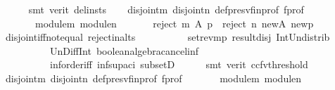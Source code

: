 \begin{isabellebody}
\ \ \ \ \isamarkupfalse%
\ {\isacharparenleft}{\kern0pt}smt\ {\isacharparenleft}{\kern0pt}verit{\isacharcomma}{\kern0pt}\ del{\isacharunderscore}{\kern0pt}insts{\isacharparenright}{\kern0pt}{\isacharparenright}{\kern0pt}\isanewline
\ \ \isamarkupfalse%
\ disjoint{\isacharunderscore}{\kern0pt}m\ disjoint{\isacharunderscore}{\kern0pt}n\ def{\isacharunderscore}{\kern0pt}presv{\isacharunderscore}{\kern0pt}fin{\isacharunderscore}{\kern0pt}prof\ f{\isacharunderscore}{\kern0pt}prof\isanewline
\ \ \ \ \ \ \ module{\isacharunderscore}{\kern0pt}m\ module{\isacharunderscore}{\kern0pt}n\ \isamarkupfalse%
\ {}{\isacharcolon}{\kern0pt}\isanewline
\ \ \ \ {\isachardoublequoteopen}{\isacharparenleft}{\kern0pt}reject\ m\ A\ p\ {\isasyminter}\ reject\ n\ {\isacharquery}{\kern0pt}new{\isacharunderscore}{\kern0pt}A\ {\isacharquery}{\kern0pt}new{\isacharunderscore}{\kern0pt}p{\isacharparenright}{\kern0pt}\ {\isacharequal}{\kern0pt}\ {\isacharbraceleft}{\kern0pt}{\isacharbraceright}{\kern0pt}{\isachardoublequoteclose}\isanewline
\ \ \ \ \isamarkupfalse%
\ disjoint{\isacharunderscore}{\kern0pt}iff{\isacharunderscore}{\kern0pt}not{\isacharunderscore}{\kern0pt}equal\ reject{\isacharunderscore}{\kern0pt}in{\isacharunderscore}{\kern0pt}alts\isanewline
\ \ \ \ \ \ \ \ \ \ set{\isacharunderscore}{\kern0pt}rev{\isacharunderscore}{\kern0pt}mp\ result{\isacharunderscore}{\kern0pt}disj\ Int{\isacharunderscore}{\kern0pt}Un{\isacharunderscore}{\kern0pt}distrib{}\isanewline
\ \ \ \ \ \ \ \ \ \ Un{\isacharunderscore}{\kern0pt}Diff{\isacharunderscore}{\kern0pt}Int\ boolean{\isacharunderscore}{\kern0pt}algebra{\isacharunderscore}{\kern0pt}cancel{\isachardot}{\kern0pt}inf{}\isanewline
\ \ \ \ \ \ \ \ \ \ inf{\isachardot}{\kern0pt}order{\isacharunderscore}{\kern0pt}iff\ inf{\isacharunderscore}{\kern0pt}sup{\isacharunderscore}{\kern0pt}aci{\isacharparenleft}{\kern0pt}{}{\isacharparenright}{\kern0pt}\ subsetD\isanewline
\ \ \ \ \isamarkupfalse%
\ {\isacharparenleft}{\kern0pt}smt\ {\isacharparenleft}{\kern0pt}verit{\isacharcomma}{\kern0pt}\ ccfv{\isacharunderscore}{\kern0pt}threshold{\isacharparenright}{\kern0pt}{\isacharparenright}{\kern0pt}\isanewline
\ \ \isamarkupfalse%
\ disjoint{\isacharunderscore}{\kern0pt}m\ disjoint{\isacharunderscore}{\kern0pt}n\ def{\isacharunderscore}{\kern0pt}presv{\isacharunderscore}{\kern0pt}fin{\isacharunderscore}{\kern0pt}prof\ f{\isacharunderscore}{\kern0pt}prof\isanewline
\ \ \ \ \ \ \ module{\isacharunderscore}{\kern0pt}m\ module{\isacharunderscore}{\kern0pt}n\ \isamarkupfalse%

\end{isabellebody}
